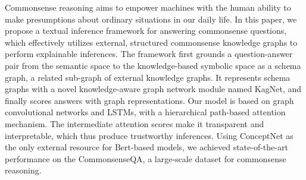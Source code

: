 Commonsense reasoning aims to empower machines with the human ability to make presumptions about ordinary situations in our daily life. 
In this paper, we propose a textual inference framework for answering commonsense questions, which effectively utilizes external, structured commonsense knowledge graphs to perform explainable inferences. The framework first grounds a question-answer pair from the semantic space to the knowledge-based symbolic space as a schema graph, a related sub-graph of external knowledge graphs. It represents schema graphs with a novel knowledge-aware graph network module named KagNet, and finally scores answers with graph representations. Our model is based on graph convolutional networks and LSTMs, with a hierarchical path-based attention mechanism. The intermediate attention scores make it transparent and interpretable, which thus produce trustworthy inferences. Using ConceptNet as the only external resource for Bert-based models, we achieved state-of-the-art performance on the CommonsenseQA, a large-scale dataset for commonsense reasoning.
